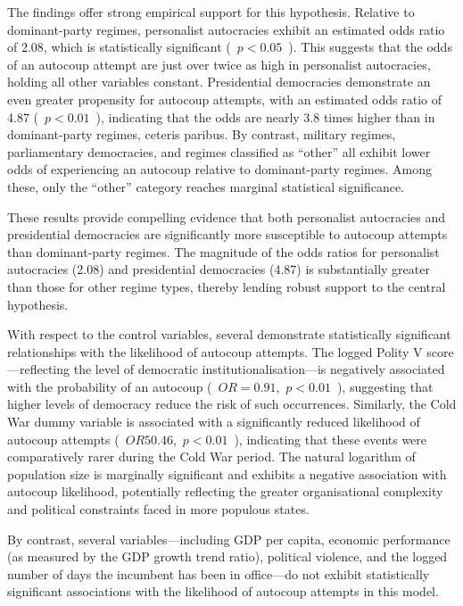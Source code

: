 \documentclass[
  12pt,
]{report}
\begin{document}
\begin{table}
{}

\end{table}%

The findings offer strong empirical support for this hypothesis.
Relative to dominant-party regimes, personalist autocracies exhibit an
estimated odds ratio of 2.08, which is statistically significant (\,
\(p<0.05\) \,). This suggests that the odds of an autocoup attempt are
just over twice as high in personalist autocracies, holding all other
variables constant. Presidential democracies demonstrate an even greater
propensity for autocoup attempts, with an estimated odds ratio of 4.87 (
\,\(p<0.01\) \,), indicating that the odds are nearly 3.8 times higher
than in dominant-party regimes, ceteris paribus. By contrast, military
regimes, parliamentary democracies, and regimes classified as ``other''
all exhibit lower odds of experiencing an autocoup relative to
dominant-party regimes. Among these, only the ``other'' category reaches
marginal statistical significance.

These results provide compelling evidence that both personalist
autocracies and presidential democracies are significantly more
susceptible to autocoup attempts than dominant-party regimes. The
magnitude of the odds ratios for personalist autocracies (2.08) and
presidential democracies (4.87) is substantially greater than those for
other regime types, thereby lending robust support to the central
hypothesis.

With respect to the control variables, several demonstrate statistically
significant relationships with the likelihood of autocoup attempts. The
logged Polity V score---reflecting the level of democratic
institutionalisation---is negatively associated with the probability of
an autocoup (\, \(OR = 0.91\), \,\(p<0.01\) \,), suggesting that higher
levels of democracy reduce the risk of such occurrences. Similarly, the
Cold War dummy variable is associated with a significantly reduced
likelihood of autocoup attempts ( \,\(OR 5 0.46\), \,\(p<0.01\) \,),
indicating that these events were comparatively rarer during the Cold
War period. The natural logarithm of population size is marginally
significant and exhibits a negative association with autocoup
likelihood, potentially reflecting the greater organisational complexity
and political constraints faced in more populous states.

By contrast, several variables---including GDP per capita, economic
performance (as measured by the GDP growth trend ratio), political
violence, and the logged number of days the incumbent has been in
office---do not exhibit statistically significant associations with the
likelihood of autocoup attempts in this model.
\end{document}
